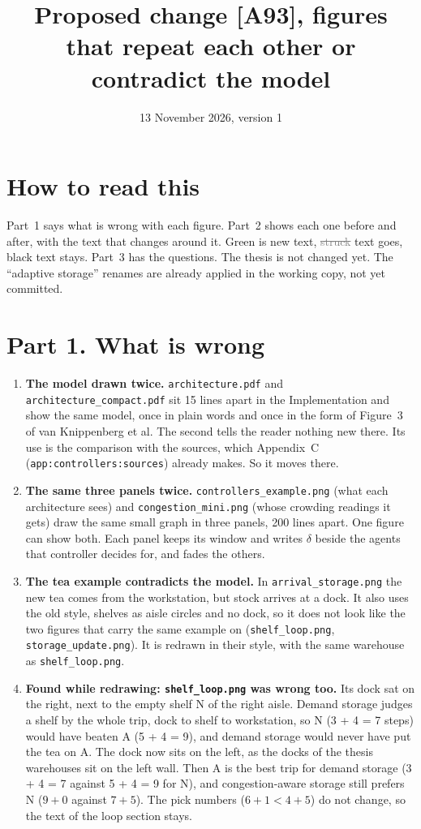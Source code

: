 \documentclass[11pt,a4paper]{article}
\title{Proposed change [A93], figures that repeat each other or contradict the model}
\date{13 November 2026, version 1}
\newcommand{\new}[1]{\textcolor{newc}{#1}}
\newcommand{\old}[1]{\textcolor{gray}{\sout{#1}}}
\begin{document}
\maketitle

\section*{How to read this}
Part~1 says what is wrong with each figure. Part~2 shows each one before and after, with the
text that changes around it. \new{Green} is new text, \old{struck} text goes, black text stays.
Part~3 has the questions. The thesis is not changed yet. The ``adaptive storage'' renames are
already applied in the working copy, not yet committed.

\section*{Part 1. What is wrong}

\begin{enumerate}[leftmargin=1.4em]
\item \textbf{The model drawn twice.} \texttt{architecture.pdf} and
  \texttt{architecture\_compact.pdf} sit 15 lines apart in the Implementation and show the same
  model, once in plain words and once in the form of Figure~3 of van Knippenberg et al. The second
  tells the reader nothing new there. Its use is the comparison with the sources, which Appendix~C
  (\texttt{app:controllers:sources}) already makes. So it moves there.
\item \textbf{The same three panels twice.} \texttt{controllers\_example.png} (what each architecture
  sees) and \texttt{congestion\_mini.png} (whose crowding readings it gets) draw the same small graph
  in three panels, 200 lines apart. One figure can show both. Each panel keeps its window and writes
  $\delta$ beside the agents that controller decides for, and fades the others.
\item \textbf{The tea example contradicts the model.} In \texttt{arrival\_storage.png} the new tea
  comes from the workstation, but stock arrives at a dock. It also uses the old style, shelves as
  aisle circles and no dock, so it does not look like the two figures that carry the same example
  on (\texttt{shelf\_loop.png}, \texttt{storage\_update.png}). It is redrawn in their style, with the
  same warehouse as \texttt{shelf\_loop.png}.
\item \textbf{Found while redrawing: \texttt{shelf\_loop.png} was wrong too.} Its dock sat on the
  right, next to the empty shelf N of the right aisle. Demand storage judges a shelf by the whole trip,
  dock to shelf to workstation, so N (3 + 4 = 7 steps) would have beaten A (5 + 4 = 9), and demand
  storage would never have put the tea on A. The dock now sits on the left, as the docks of the
  thesis warehouses sit on the left wall. Then A is the best trip for demand storage (3 + 4 = 7
  against 5 + 4 = 9 for N), and congestion-aware storage still prefers N ($9 + 0$ against
  $7 + 5$). The pick numbers ($6 + 1 < 4 + 5$) do not change, so the text of the loop section stays.
\end{enumerate}
\end{document}
